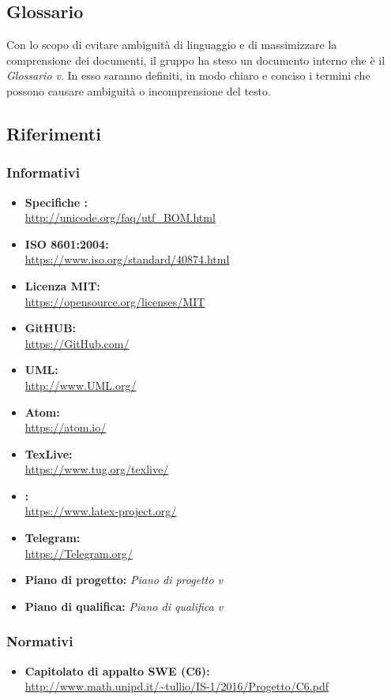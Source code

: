   \subsection{Glossario}
          Con lo scopo di evitare ambiguità di linguaggio e di massimizzare la comprensione dei documenti, il
          gruppo ha steso un documento interno che è il \emph{Glossario v}\VersioneG{}. In esso saranno definiti, in modo
          chiaro e conciso i termini che possono causare ambiguità o incomprensione del testo.
  \subsection{Riferimenti}
    \subsubsection{Informativi}
      \begin{itemize}
        \item \textbf{Specifiche :}\\
        \url{http://unicode.org/faq/utf_BOM.html}
        \item \textbf{ISO 8601:2004:} \\
        \url{https://www.iso.org/standard/40874.html}\\
        \item \textbf{Licenza MIT:}\\
        \url{https://opensource.org/licenses/MIT}
        \item \textbf{GitHUB:}\\
        \url{https://GitHub.com/}
        \item \textbf{UML:} \\
        \url{http://www.UML.org/}
        \item \textbf{Atom:}\\
        \url{https://atom.io/}
        \item \textbf{TexLive:}\\
        \url{https://www.tug.org/texlive/}
        \item \textbf{\glossaryItem{\LaTeX}:}\\
        \url{https://www.latex-project.org/}
        \item \textbf{Telegram:}\\
        \url{https://Telegram.org/}
        \item \textbf{Piano di progetto:} \emph{Piano di progetto v}\VersionePP{}
        \item \textbf{Piano di qualifica:} \emph{Piano di qualifica v}\VersionePQ{}
      \end{itemize}
    \subsubsection{Normativi}
      \begin{itemize}
        \item \textbf{Capitolato di appalto SWE (C6):}\\
        \url{http://www.math.unipd.it/~tullio/IS-1/2016/Progetto/C6.pdf}
      \end{itemize}
